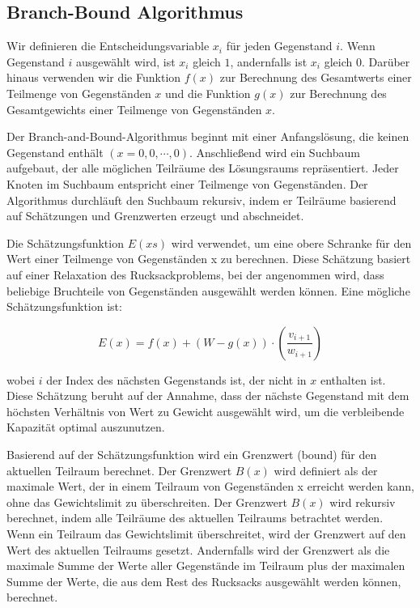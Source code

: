 \subsection{Branch-Bound Algorithmus}
Wir definieren die Entscheidungsvariable $x_i$ für jeden 
Gegenstand $i$. Wenn Gegenstand $i$ ausgewählt wird, ist $x_i$ 
gleich $1$, andernfalls ist $x_i$ gleich $0$. Darüber hinaus 
verwenden wir die Funktion $f(x)$ zur Berechnung des 
Gesamtwerts einer Teilmenge von Gegenständen $x$ und die 
Funktion $g(x)$ zur Berechnung des Gesamtgewichts einer 
Teilmenge von Gegenständen $x$.

Der Branch-and-Bound-Algorithmus beginnt mit einer 
Anfangslösung, die keinen Gegenstand enthält 
$(x = {0, 0, \cdots, 0})$. Anschließend wird ein Suchbaum 
aufgebaut, der alle möglichen Teilräume des Lösungsraums 
repräsentiert. Jeder Knoten im Suchbaum entspricht einer 
Teilmenge von Gegenständen. Der Algorithmus durchläuft den 
Suchbaum rekursiv, indem er Teilräume basierend auf 
Schätzungen und Grenzwerten erzeugt und abschneidet.

Die Schätzungsfunktion $E(xs)$ wird verwendet, um eine obere 
Schranke für den Wert einer Teilmenge von Gegenständen x zu 
berechnen. Diese Schätzung basiert auf einer Relaxation des 
Rucksackproblems, bei der angenommen wird, dass beliebige 
Bruchteile von Gegenständen ausgewählt werden können. Eine 
mögliche Schätzungsfunktion ist:

\begin{equation}
    E(x) = f(x) + (W - g(x)) \cdot \left(\frac{v_{i+1}}{w_{i+1}}\right)
\end{equation}

wobei $i$ der Index des nächsten Gegenstands ist, der nicht 
in $x$ enthalten ist. Diese Schätzung beruht auf der Annahme, 
dass der nächste Gegenstand mit dem höchsten Verhältnis von 
Wert zu Gewicht ausgewählt wird, um die verbleibende 
Kapazität optimal auszunutzen.

Basierend auf der Schätzungsfunktion wird ein Grenzwert 
(bound) für den aktuellen Teilraum berechnet. Der Grenzwert 
$B(x)$ wird definiert als der maximale Wert, der in einem 
Teilraum von Gegenständen x erreicht werden kann, ohne das 
Gewichtslimit zu überschreiten. Der Grenzwert $B(x)$ wird 
rekursiv berechnet, indem alle Teilräume des aktuellen 
Teilraums betrachtet werden. Wenn ein Teilraum das 
Gewichtslimit überschreitet, wird der Grenzwert auf den Wert 
des aktuellen Teilraums gesetzt. Andernfalls wird der 
Grenzwert als die maximale Summe der Werte aller Gegenstände 
im Teilraum plus der maximalen Summe der Werte, die aus dem 
Rest des Rucksacks ausgewählt werden können, berechnet.

